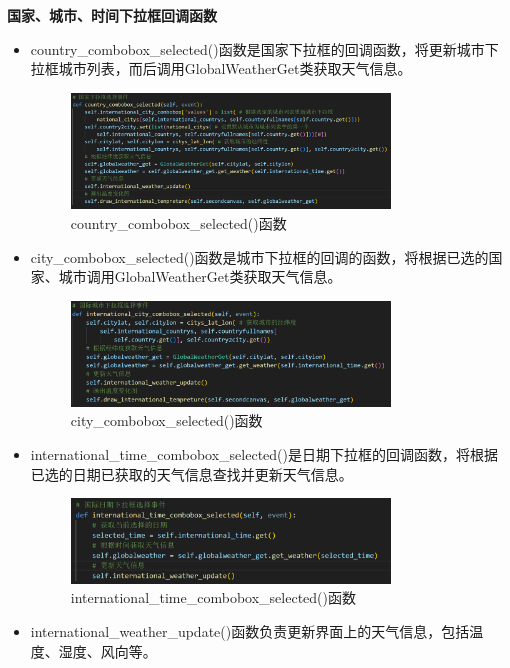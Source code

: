 \documentclass[UTF8]{ctexart}
\begin{document}
\begin{enumerate}
   \textbf{国家、城市、时间下拉框回调函数}
   \begin{itemize}
      \item country\_combobox\_selected()函数是国家下拉框的回调函数，将更新城市下拉框城市列表，而后调用GlobalWeatherGet类获取天气信息。
      \begin{figure}[H]
         \centering
         \includegraphics[width=0.8\textwidth]{pica.png}
         \caption{country\_combobox\_selected()函数}
      \end{figure}
      \item city\_combobox\_selected()函数是城市下拉框的回调的函数，将根据已选的国家、城市调用GlobalWeatherGet类获取天气信息。
      \begin{figure}[H]
         \centering
         \includegraphics[width=0.8\textwidth]{picb.png}
         \caption{city\_combobox\_selected()函数}
      \end{figure}
      \item international\_time\_combobox\_selected()是日期下拉框的回调函数，将根据已选的日期已获取的天气信息查找并更新天气信息。
      \begin{figure}[H]
         \centering
         \includegraphics[width=0.8\textwidth]{picc.png}
         \caption{international\_time\_combobox\_selected()函数}
      \end{figure}
      \item international\_weather\_update()函数负责更新界面上的天气信息，包括温度、湿度、风向等。

\end{itemize}
\end{enumerate}
\end{document}
